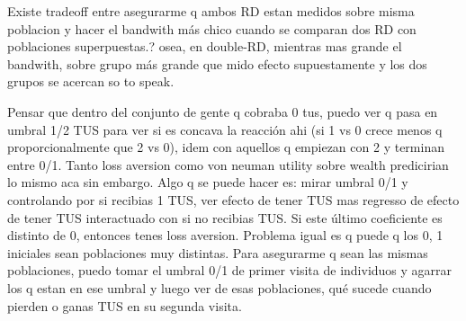 \documentclass[12pt]{article}
\begin{document}
Existe tradeoff entre asegurarme q ambos RD estan medidos sobre misma poblacion y hacer el bandwith más chico cuando se comparan dos RD con poblaciones superpuestas.? osea, en double-RD, mientras mas grande el bandwith, sobre grupo más grande que mido efecto supuestamente y los dos grupos se acercan so to speak.

Pensar que dentro del conjunto de gente q cobraba 0 tus, puedo ver q pasa en umbral 1/2 TUS para ver si es concava la reacción ahi (si 1 vs 0 crece menos q proporcionalmente que 2 vs 0), idem con aquellos q empiezan con 2 y terminan entre 0/1. Tanto loss aversion como von neuman utility sobre wealth predicirian lo mismo aca sin embargo.
Algo q se puede hacer es: mirar umbral 0/1 y controlando por si recibias 1 TUS, ver efecto de tener TUS mas regresso de efecto de tener TUS interactuado con si no recibias TUS. Si este último coeficiente es distinto de 0, entonces tenes loss aversion. Problema igual es q puede q los 0, 1 iniciales sean poblaciones muy distintas. Para asegurarme q sean las mismas poblaciones, puedo tomar el umbral 0/1 de primer visita de individuos y agarrar los q estan en ese umbral y luego ver de esas poblaciones, qué sucede cuando pierden o ganas TUS en su segunda visita.



\end{document}
